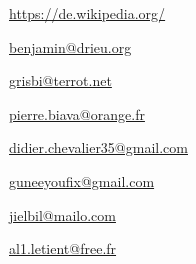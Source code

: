 \urldef{\urlWikipedia}%
\url{https://de.wikipedia.org/}






\urldef{\urlBenjaminDrieuEmail}%
\url{benjamin@drieu.org}     %



\urldef{\urlFrancoisTerrotEmail}%
\url{grisbi@terrot.net}     %


\urldef{\urlPierreBiavaEmail}%
\url{pierre.biava@orange.fr}     %

\urldef{\urlDidierChevalierEmail}%
\url{didier.chevalier35@gmail.com}     %

\urldef{\urlWilliamOllivierEmail}%
\url{guneeyoufix@gmail.com}     %


\urldef{\urlJeanLucDuflotEmail}%
\url{jielbil@mailo.com}     %

\urldef{\urlAlainLetientEmail}%
\url{al1.letient@free.fr}     %



